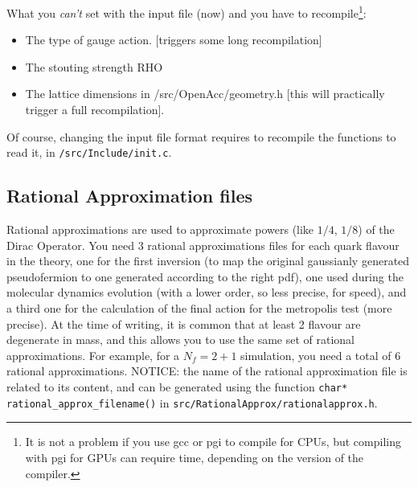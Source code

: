 What you \emph{can't} set with the input file (now) and you have to
recompile\footnote{ It is not a problem if you use gcc or pgi to compile for 
    CPUs, but compiling with pgi for GPUs can require time, depending on the
version of the compiler.}:
\begin{itemize}
    \item The type of gauge action. [triggers some long recompilation]
    \item The stouting strength RHO 
    \item The lattice dimensions in /src/OpenAcc/geometry.h [this will
        practically trigger a full recompilation].
\end{itemize}
Of course, changing the input file format requires to recompile the functions 
to read it, in \verb|/src/Include/init.c|.

\subsection{ Rational Approximation files}
Rational approximations are used to approximate powers (like $1/4$,
$1/8$) of the Dirac Operator.
You need $3$ rational approximations files for each quark flavour in the
theory, one for the first inversion (to map the original
gaussianly generated pseudofermion to one generated according to the
right pdf), one used during the molecular dynamics evolution (with a
lower order, so less precise, for speed), and a third one for the
calculation of the final action for the metropolis test (more
precise). At the time of writing, it is common that at least 2 flavour are 
degenerate in mass, and this allows you to use the same set of rational
approximations. For example, for a $N_f=2+1$ simulation, you need a total
of 6 rational approximations.
NOTICE: the name of the rational approximation file is related to
its content, and can be generated using the function
\verb|char* rational_approx_filename()| in
\verb|src/RationalApprox/rationalapprox.h|.

